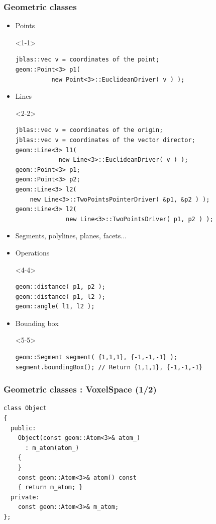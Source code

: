 \documentclass[compress]{beamer}
\begin{document}
\begin{frame}[fragile]
  \frametitle{Geometric classes}
  \begin{itemize}
    \item<1-> Points
      \begin{onlyenv}<1-1>
        \begin{lstlisting}
jblas::vec v = coordinates of the point;
geom::Point<3> p1( 
          new Point<3>::EuclideanDriver( v ) );
        \end{lstlisting}
      \end{onlyenv}
    \item<2-> Lines
      \begin{onlyenv}<2-2>
        \begin{lstlisting}
jblas::vec v = coordinates of the origin;
jblas::vec v = coordinates of the vector director;
geom::Line<3> l1( 
            new Line<3>::EuclideanDriver( v ) );
geom::Point<3> p1;
geom::Point<3> p2;
geom::Line<3> l2(
    new Line<3>::TwoPointsPointerDriver( &p1, &p2 ) );
geom::Line<3> l2(
              new Line<3>::TwoPointsDriver( p1, p2 ) );
        \end{lstlisting}
      \end{onlyenv}
     \item<3-> Segments, polylines, planes, facets...
     \item<4-> Operations
      \begin{onlyenv}<4-4>
        \begin{lstlisting}
geom::distance( p1, p2 );
geom::distance( p1, l2 );
geom::angle( l1, l2 );
        \end{lstlisting}
      \end{onlyenv}
     \item<5-> Bounding box
\begin{onlyenv}<5-5>
  \begin{lstlisting}
geom::Segment segment( {1,1,1}, {-1,-1,-1} );
segment.boundingBox(); // Return {1,1,1}, {-1,-1,-1}
  \end{lstlisting}
\end{onlyenv}
  \end{itemize}
\end{frame}

\begin{frame}[fragile]
  \frametitle{Geometric classes : VoxelSpace (1/2)}

  \begin{lstlisting}
class Object
{
  public:
    Object(const geom::Atom<3>& atom_)
      : m_atom(atom_)
    {
    }
    const geom::Atom<3>& atom() const 
    { return m_atom; }
  private:
    const geom::Atom<3>& m_atom;
};
  \end{lstlisting}
\end{frame}
\end{document}
